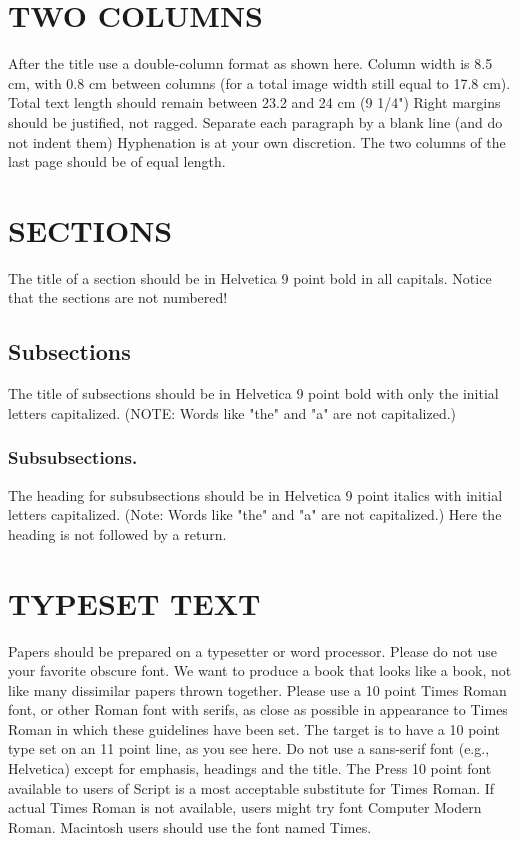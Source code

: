 \section{TWO COLUMNS}
After the title use a double-column format as shown here. Column
width is 8.5 cm, with 0.8 cm between columns (for a total image
width still equal to 17.8 cm).  Total text length should remain
between 23.2 and 24 cm (9 1/4") Right margins should be justified,
not ragged.   Separate each paragraph by a blank line (and do not
indent them)  Hyphenation is at your own discretion.  The two
columns of the last page should be of equal length.

\section{SECTIONS}
The title of a section should be in Helvetica 9 point bold in all
capitals.  Notice that the sections are not numbered!

\subsection{Subsections}
The title of subsections should be in Helvetica 9 point bold with only
the initial letters capitalized. (NOTE: Words like "the" and "a" are not
capitalized.)

\subsubsection{Subsubsections.} 
The heading for subsubsections should be in
Helvetica 9 point italics with initial letters capitalized. (Note: Words
like "the" and "a" are not capitalized.)  Here the heading is not
followed by a return.

\section{TYPESET TEXT}
Papers should be prepared on a typesetter or word processor.  Please
do not use your favorite obscure font.  We want to produce a book
that looks like a book, not like many dissimilar papers thrown
together.  Please use a 10 point Times Roman font, or other Roman
font with serifs, as close as possible in appearance to Times Roman in
which these guidelines have been set.  The target is to have a 10
point type set on an 11 point line, as you see here.  Do not use a
sans-serif font (e.g., {\helveticafont Helvetica}) 
except for emphasis, headings and the
title.  The Press 10 point font available to users of Script is a most
acceptable substitute for Times Roman.  If actual Times Roman is not
available, users might try font Computer Modern Roman.  Macintosh
users should use the font named Times.

